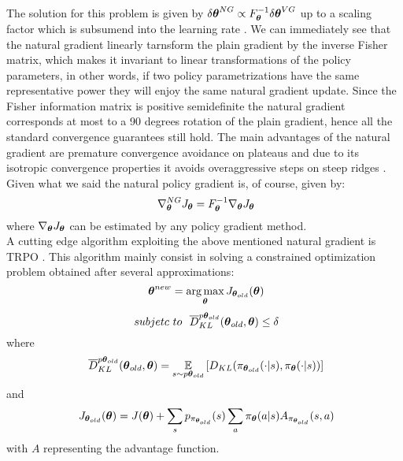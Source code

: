 The solution for this problem is given by $\delta\boldsymbol{\theta}^{NG}\propto F^{-1}_{\boldsymbol{\theta}}\delta\boldsymbol{\theta}^{VG}$ up to a scaling factor which is subsumend into the learning rate \citep{deisenroth2013survey}. We can immediately see that the natural gradient linearly tarnsform the plain gradient by the inverse Fisher matrix, which makes it invariant to linear transformations of the policy parameters, in other words, if two policy parametrizations have the same representative power they will enjoy the same natural gradient update. Since the Fisher information matrix is positive semidefinite the natural gradient corresponds at most to a 90 degrees rotation of the plain gradient, hence all the standard convergence guarantees still hold. The main advantages of the natural gradient are premature convergence avoidance on plateaus and due to its isotropic convergence properties it avoids overaggressive steps on steep ridges \citep{deisenroth2013survey}. Given what we said the natural policy gradient is, of course, given by:
\[
\ \nabla_{\boldsymbol{\theta}}^{NG} J_{\boldsymbol{\theta}}=F^{-1}_{\boldsymbol{\theta}} \nabla_{\boldsymbol{\theta}} J_{\boldsymbol{\theta}}
\]
where $\nabla_{\boldsymbol{\theta}} J_{\boldsymbol{\theta}}$ can be estimated by any policy gradient method.
\\
A cutting edge algorithm exploiting the above mentioned natural gradient is \ac{TRPO} \citep{schulman2015trust}. This algorithm mainly consist in solving a constrained optimization problem obtained after several approximations:
\[
\ \vtheta^{new}=\argmax_{\vtheta}J_{\vtheta_{old}}(\vtheta)
\]
\[
\ subjetc~to~~ \overline{D}_{KL}^{p\boldsymbol{\theta}_{old}}(\boldsymbol{\theta}_{old},\boldsymbol{\theta})\le\delta
\]
where \[
\ \overline{D}_{KL}^{p\vtheta_{old}}(\vtheta_{old},\vtheta)=\EVV[s \sim p\vtheta_{old}]{D_{KL}(\pi_{\vtheta_{old}}(\cdot|s),\pi_{\vtheta}(\cdot|s))}
\]
and \[
\ J_{\boldsymbol{\theta}_{old}}(\boldsymbol{\theta})= J(\boldsymbol{\theta})+\sum_{s}p_{\pi_{\boldsymbol{\theta}_{old}}}(s)\sum_{a}\pi_{\boldsymbol{\theta}}(a|s)A_{\pi_{\boldsymbol{\theta}_{old}}}(s,a)
\]
with $A$ representing the advantage function.
\vspace{-0.05in}
